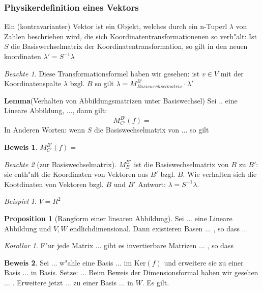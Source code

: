 \documentclass[11pt]{article}
\theoremstyle{remark}
\newtheorem{exa}{Beispiel}[section]
\newtheorem*{notte}{Beachte}
\theoremstyle{definition}
\newtheorem{prof}{Beweis}
\newtheorem*{proposition}{Proposition}
\theoremstyle{remark}
\newtheorem*{korollar}{Korollar}
\begin{document}
\subsubsection{Physikerdefinition eines Vektors}
\label{sec:phyv}

Ein (kontravarianter) Vektor ist ein Objekt, welches durch ein n-Tuperl \(\lambda\)
von Zahlen beschrieben wird, die sich Koordinatentransformationenen so
verh"alt: Ist $S$ die Basiswechselmatrix der Koordinatentransformation, so gilt
in den neuen koordinaten $\lambda'=S^{-1}\lambda$

\begin{notte}
  Diese Transformationsformel haben wir gesehen: ist $v\in V$ mit der
  Koordinatenspalte $\lambda$ bzgl. $B$ so gilt
  $\lambda=M^{B'}_{Basiswechselmatrix}\cdot \lambda ' $
\end{notte}

\textbf{Lemma}(Verhalten von Abbildungsmatrizen unter Basiswechsel)
Sei .. eine Lineare Abbildung, ..., dann gilt:
\[
  M^{B'}_{C'}(f)=
\] In Anderen Worten: wenn $S$ die Basiswechselmatrix von ... so gilt

\begin{prof}
  $M^{B'}_{C'}(f)=$
\end{prof}

\begin{notte}[zur Basiswechselmatrix]
  $ M^{B'}_{B}$ ist die Basiswechselmatrix von $B$ zu $B'$: sie enth"alt die
  Koordinaten von Vektoren aus $B'$ bzgl. $B$. Wie verhalten sich die
  Kootdinaten von Vektoren bzgl. $B$ und $B'$ Antwort: $\lambda =
  S^{-1}\lambda$.
\end{notte}

\begin{exa}
  $V=R^{2}$
\end{exa}

\begin{proposition}[Rangform einer linearen Abbildung]
  Sei ... eine Lineare Abbildung und $V,W$ endlichdimensional. Dann existieren
  Basen ... , so dass ...
\end{proposition}

\begin{korollar}
  F"ur jede Matrix ... gibt es invertierbare Matrizen ... , so dass
\end{korollar}

\begin{prof}
  Sei ... w"ahle eine Basis ... im $\text{Ker}(f)$  und erweitere sie zu einer
  Basis ... in Basis. Setze: ... Beim Beweis der Dimensionsformal haben wir
  gesehen ... . Erweitere jetzt ... zu einer Basis ... in $W$. Es gilt. 
\end{prof}
\end{document}
